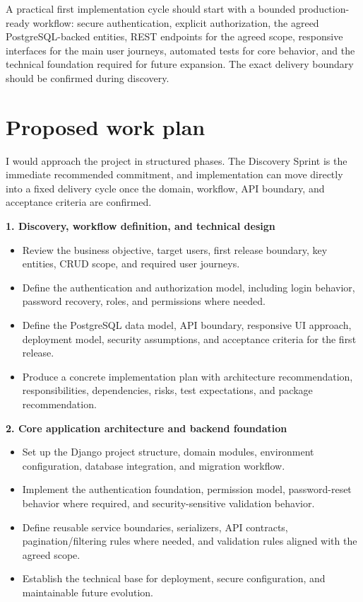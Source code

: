 \documentclass[11pt,a4paper]{article}
\begin{document}
A practical first implementation cycle should start with a bounded production-ready workflow: secure authentication, explicit authorization, the agreed PostgreSQL-backed entities, REST endpoints for the agreed scope, responsive interfaces for the main user journeys, automated tests for core behavior, and the technical foundation required for future expansion. The exact delivery boundary should be confirmed during discovery.\par

\section*{Proposed work plan}

I would approach the project in structured phases. The Discovery Sprint is the immediate recommended commitment, and implementation can move directly into a fixed delivery cycle once the domain, workflow, API boundary, and acceptance criteria are confirmed.\par

\textbf{1. Discovery, workflow definition, and technical design}\par

\begin{itemize}
\item Review the business objective, target users, first release boundary, key entities, CRUD scope, and required user journeys.
\item Define the authentication and authorization model, including login behavior, password recovery, roles, and permissions where needed.
\item Define the PostgreSQL data model, API boundary, responsive UI approach, deployment model, security assumptions, and acceptance criteria for the first release.
\item Produce a concrete implementation plan with architecture recommendation, responsibilities, dependencies, risks, test expectations, and package recommendation.
\end{itemize}

\textbf{2. Core application architecture and backend foundation}\par

\begin{itemize}
\item Set up the Django project structure, domain modules, environment configuration, database integration, and migration workflow.
\item Implement the authentication foundation, permission model, password-reset behavior where required, and security-sensitive validation behavior.
\item Define reusable service boundaries, serializers, API contracts, pagination/filtering rules where needed, and validation rules aligned with the agreed scope.
\item Establish the technical base for deployment, secure configuration, and maintainable future evolution.
\end{itemize}
\end{document}
